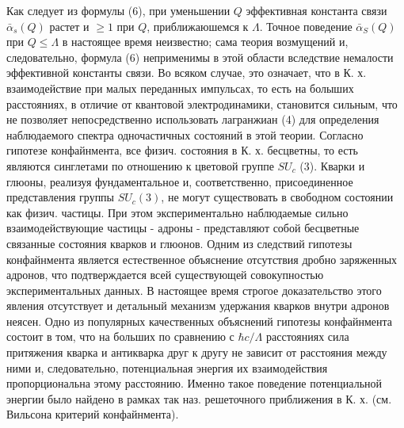\documentclass[10pt]{article}
\begin{document}
Как следует из формулы (6), при уменьшении $Q$ эффективная константа связи $\bar{\alpha}_{s}(Q)$ растет и $\geqslant 1$ при $Q$, приближаюшемся к $\Lambda$. Точное поведение $\bar{\alpha}_{S}(Q)$ при $Q \leqslant \Lambda$ в настоящее время неизвестно; сама теория возмущений и, следовательно, формула (6) неприменимы в этой области вследствие немалости эффективной константы связи. Во всяком случае, это означает, что в К. х. взаимодействие при малых переданных импульсах, то есть на болыших расстояниях, в отличие от квантовой электродинамики, становится сильным, что не позволяет непосредственно использовать лагранжиан (4) для определения наблюдаемого спектра одночастичных состояний в этой теории. Согласно гипотезе конфайнмента, все физич. состояния в К. х. бесцветны, то есть являются синглетами по отношению к цветовой группе $S U_{c}$ (3). Кварки и глюоны, реализуя фундаментальное и, соответственно, присоединенное представления группы $S U_{c}(3)$, не могут существовать в свободном состоянии как физич. частицы. При этом экспериментально наблюдаемые сильно взаимодействующие частицы - адроны - представляют собой бесцветные связанные состояния кварков и глюонов. Одним из следствий гипотезы конфайнмента является естественное объяснение отсутствия дробно заряженных адронов, что подтверждается всей существующей совокупностью экспериментальных данных. В настоящее время строгое доказательство этого явления отсутствует и детальный механизм удержания кварков внутри адронов неясен. Одно из популярных качественных объяснений гипотезы конфайнмента состоит в том, что на больших по сравнению с $\hbar c / \Lambda$ расстояниях сила притяжения кварка и антикварка друг к другу не зависит от расстояния между ними и, следовательно, потенциальная энергия их взаимодействия пропорциональна этому расстоянию. Именно такое поведение потенциальной энергии было найдено в рамках так наз. решеточного приближения в К. х. (см. Вильсона критерий конфайнмента).
\end{document}
